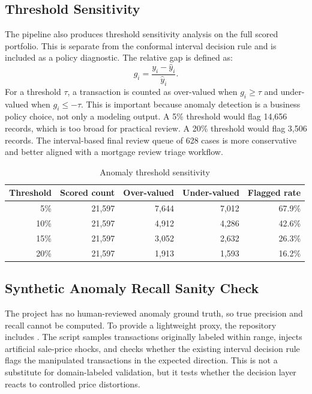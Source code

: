 \documentclass[12pt,a4paper]{article}
\begin{document}
\subsection{Threshold Sensitivity}
The pipeline also produces threshold sensitivity analysis on the full scored portfolio. This is separate from the conformal interval decision rule and is included as a policy diagnostic. The relative gap is defined as:
\[
    g_i = \frac{y_i-\hat{y}_i}{\hat{y}_i}.
\]
For a threshold $\tau$, a transaction is counted as over-valued when $g_i \geq \tau$ and under-valued when $g_i \leq -\tau$. This is important because anomaly detection is a business policy choice, not only a modeling output. A 5\% threshold would flag 14,656 records, which is too broad for practical review. A 20\% threshold would flag 3,506 records. The interval-based final review queue of 628 cases is more conservative and better aligned with a mortgage review triage workflow.

\begin{table}[H]
\centering
\caption{Anomaly threshold sensitivity}
\label{tab:threshold}
\begin{tabular}{rrrrr}
\toprule
\textbf{Threshold} & \textbf{Scored count} & \textbf{Over-valued} & \textbf{Under-valued} & \textbf{Flagged rate}\\
\midrule
5\% & 21,597 & 7,644 & 7,012 & 67.9\%\\
10\% & 21,597 & 4,912 & 4,286 & 42.6\%\\
15\% & 21,597 & 3,052 & 2,632 & 26.3\%\\
20\% & 21,597 & 1,913 & 1,593 & 16.2\%\\
\bottomrule
\end{tabular}
\end{table}

\subsection{Synthetic Anomaly Recall Sanity Check}
The project has no human-reviewed anomaly ground truth, so true precision and recall cannot be computed. To provide a lightweight proxy, the repository includes . The script samples transactions originally labeled within range, injects artificial sale-price shocks, and checks whether the existing interval decision rule flags the manipulated transactions in the expected direction. This is not a substitute for domain-labeled validation, but it tests whether the decision layer reacts to controlled price distortions.
\end{document}
